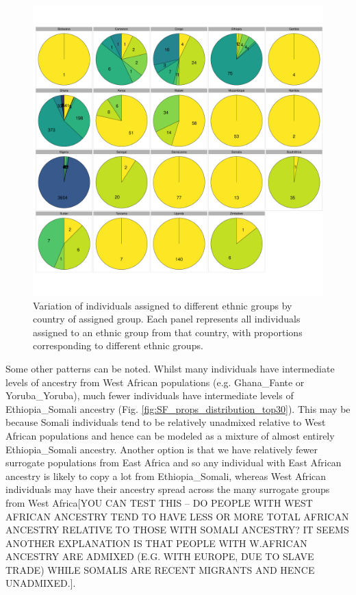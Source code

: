 \begin{figure}[htp]
    \centering
    \includegraphics[width=1.0\textwidth]{../images/chapter3/all_countries_SF_props_pie_chart.pdf}
    \caption{Variation of individuals assigned to different ethnic groups by country of assigned group. Each panel represents all individuals assigned to an ethnic group from that country, with proportions corresponding to different ethnic groups.}
    \label{fig:all_countries_SF_props_pie_chart}
\end{figure}

Some other patterns can be noted. Whilst many individuals have intermediate levels of ancestry from West African populations (e.g. Ghana\_Fante or Yoruba\_Yoruba), much fewer individuals have intermediate levels of Ethiopia\_Somali ancestry (Fig. \ref{fig:SF_props_distribution_top30}). This may be because Somali individuals tend to be relatively unadmixed relative to West African populations and hence can be modeled as a mixture of almost entirely Ethiopia\_Somali ancestry. Another option is that we have relatively fewer surrogate populations from East Africa and so any individual with East African ancestry is likely to copy a lot from Ethiopia\_Somali, whereas West African individuals may have their ancestry spread across the many surrogate groups from West Africa{\color{red}[YOU CAN TEST THIS -- DO PEOPLE WITH WEST AFRICAN ANCESTRY TEND TO HAVE LESS OR MORE TOTAL AFRICAN ANCESTRY RELATIVE TO THOSE WITH SOMALI ANCESTRY? IT SEEMS ANOTHER EXPLANATION IS THAT PEOPLE WITH W.AFRICAN ANCESTRY ARE ADMIXED (E.G. WITH EUROPE, DUE TO SLAVE TRADE) WHILE SOMALIS ARE RECENT MIGRANTS AND HENCE UNADMIXED.]}. 


